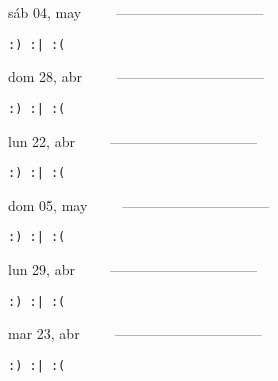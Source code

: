 \documentclass[letterpaper,10pt]{article}
\begin{document}
\begin{multicols}{3}
{sáb 04, may\ \ \ \ \ --------------------------------}
\begin{flushright}\begin{small}\texttt{:) :| :(}\end{small}\end{flushright}
\vfill
{dom 28, abr\ \ \ \ \ --------------------------------}
\begin{flushright}\begin{small}\texttt{:) :| :(}\end{small}\end{flushright}\par
\vfill
{lun 22, abr\ \ \ \ \ --------------------------------}
\begin{flushright}\begin{small}\texttt{:) :| :(}\end{small}\end{flushright}\par
\vfill
\end{multicols}
\vspace{1.05cm}

\begin{multicols}{3}
{dom 05, may\ \ \ \ \ --------------------------------}
\begin{flushright}\begin{small}\texttt{:) :| :(}\end{small}\end{flushright}
\vfill
{lun 29, abr\ \ \ \ \ --------------------------------}
\begin{flushright}\begin{small}\texttt{:) :| :(}\end{small}\end{flushright}\par
\vfill
{mar 23, abr\ \ \ \ \ --------------------------------}
\begin{flushright}\begin{small}\texttt{:) :| :(}\end{small}\end{flushright}\par
\vfill
\end{multicols}
\vspace{1.05cm}
\end{document}
